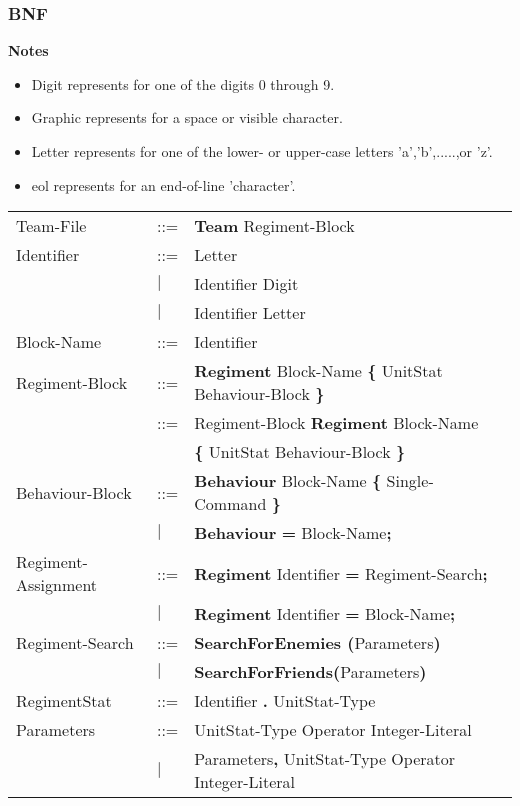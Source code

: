 	\subsubsection{BNF}
		{\bf Notes}
		\begin{itemize}
			\item Digit represents for one of the digits 0 through 9.
			\item Graphic represents for a space or visible character.
			\item Letter represents for one of the lower- or upper-case letters 'a','b',.....,or 'z'.
			\item eol represents for an end-of-line 'character'.
		\end{itemize}
		\begin{center}
				\begin{longtable}{l l l}
				\endfirsthead
				\endhead
				Team-File			&	::=	&{\bf Team} Regiment-Block\\
				Identifier			&	::=	&Letter\\
									&$\mid$	&Identifier Digit\\
									&$\mid$	&Identifier Letter\\
				Block-Name			&	::=	&Identifier\\
				Regiment-Block		&	::=	&{\bf Regiment} Block-Name {\bf \{ } UnitStat Behaviour-Block \bf{\} }\\
									&	::=	&Regiment-Block {\bf Regiment} Block-Name\\
									&		&{\bf \{ } UnitStat Behaviour-Block \bf{\} }\\
				Behaviour-Block		&	::=	&{\bf Behaviour} Block-Name {\bf \{} Single-Command {\bf \}}  \\
									&$\mid$	& {\bf Behaviour} {\bf = } Block-Name{\bf ;} \\
				Regiment-Assignment	&	::=	&{\bf Regiment} Identifier {\bf =} Regiment-Search{\bf ;}\\
									&$\mid$	&{\bf Regiment} Identifier {\bf =} Block-Name{\bf ;}\\
				Regiment-Search		&	::=	&{\bf SearchForEnemies (}Parameters{\bf)}\\
									&$\mid$	&{\bf SearchForFriends(}Parameters{\bf)}\\
				RegimentStat		&	::=	&Identifier {\bf.} UnitStat-Type \\
				Parameters			&	::=	&UnitStat-Type Operator Integer-Literal\\
				 					&$\mid$	&Parameters{\bf ,} UnitStat-Type Operator Integer-Literal\\

\end{longtable}
\end{center}
